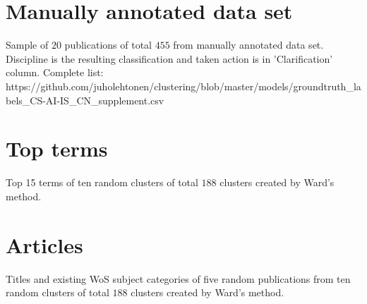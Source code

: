 \chapter{Manually annotated data set}
\label{chapter:first-appendix}
Sample of $20$ publications of total $455$ from manually annotated 
data set. Discipline is the resulting classification and taken action
is in 'Clarification' column. Complete list: 
https://github.com/juholehtonen/clustering/blob/master/models/groundtruth\_labels\_CS-AI-IS\_CN\_supplement.csv

 
\chapter{Top terms}
\label{chapter:second-appendix}
Top 15 terms of ten random clusters of total $188$ clusters 
created by Ward's method.




\chapter{Articles}
\label{chapter:appendix-articles}
Titles and existing WoS subject categories of five random 
publications from ten random clusters of total $188$ clusters 
created by Ward's method.


